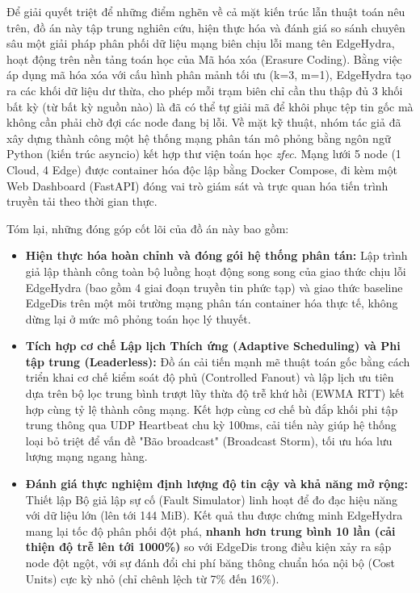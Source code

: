 \documentclass[11pt,a4paper]{article}
\begin{document}
Để giải quyết triệt để những điểm nghẽn về cả mặt kiến trúc lẫn thuật toán nêu trên, đồ án này tập trung nghiên cứu, hiện thực hóa và đánh giá so sánh chuyên sâu một giải pháp phân phối dữ liệu mạng biên chịu lỗi mang tên EdgeHydra, hoạt động trên nền tảng toán học của Mã hóa xóa (Erasure Coding). Bằng việc áp dụng mã hóa xóa với cấu hình phân mảnh tối ưu (k=3, m=1), EdgeHydra tạo ra các khối dữ liệu dư thừa, cho phép mỗi trạm biên chỉ cần thu thập đủ 3 khối bất kỳ (từ bất kỳ nguồn nào) là đã có thể tự giải mã để khôi phục tệp tin gốc mà không cần phải chờ đợi các node đang bị lỗi. Về mặt kỹ thuật, nhóm tác giả đã xây dựng thành công một hệ thống mạng phân tán mô phỏng bằng ngôn ngữ Python (kiến trúc asyncio) kết hợp thư viện toán học \textit{zfec}. Mạng lưới 5 node (1 Cloud, 4 Edge) được container hóa độc lập bằng Docker Compose, đi kèm một Web Dashboard (FastAPI) đóng vai trò giám sát và trực quan hóa tiến trình truyền tải theo thời gian thực.

Tóm lại, những đóng góp cốt lõi của đồ án này bao gồm:

\begin{itemize}
    \item \textbf{Hiện thực hóa hoàn chỉnh và đóng gói hệ thống phân tán:} Lập trình giả lập thành công toàn bộ luồng hoạt động song song của giao thức chịu lỗi EdgeHydra (bao gồm 4 giai đoạn truyền tin phức tạp) và giao thức baseline EdgeDis trên một môi trường mạng phân tán container hóa thực tế, không dừng lại ở mức mô phỏng toán học lý thuyết.
    
    \item \textbf{Tích hợp cơ chế Lập lịch Thích ứng (Adaptive Scheduling) và Phi tập trung (Leaderless):} Đồ án cải tiến mạnh mẽ thuật toán gốc bằng cách triển khai cơ chế kiểm soát độ phủ (Controlled Fanout) và lập lịch ưu tiên dựa trên bộ lọc trung bình trượt lũy thừa độ trễ khứ hồi (EWMA RTT) kết hợp cùng tỷ lệ thành công mạng. Kết hợp cùng cơ chế bù đắp khối phi tập trung thông qua UDP Heartbeat chu kỳ 100ms, cải tiến này giúp hệ thống loại bỏ triệt để vấn đề "Bão broadcast" (Broadcast Storm), tối ưu hóa lưu lượng mạng ngang hàng.
    
    \item \textbf{Đánh giá thực nghiệm định lượng độ tin cậy và khả năng mở rộng:} Thiết lập Bộ giả lập sự cố (Fault Simulator) linh hoạt để đo đạc hiệu năng với dữ liệu lớn (lên tới 144 MiB). Kết quả thu được chứng minh EdgeHydra mang lại tốc độ phân phối đột phá, \textbf{nhanh hơn trung bình 10 lần (cải thiện độ trễ lên tới 1000\%)} so với EdgeDis trong điều kiện xảy ra sập node đột ngột, với sự đánh đổi chi phí băng thông chuẩn hóa nội bộ (Cost Units) cực kỳ nhỏ (chỉ chênh lệch từ 7\% đến 16\%).
\end{itemize}
\end{document}

